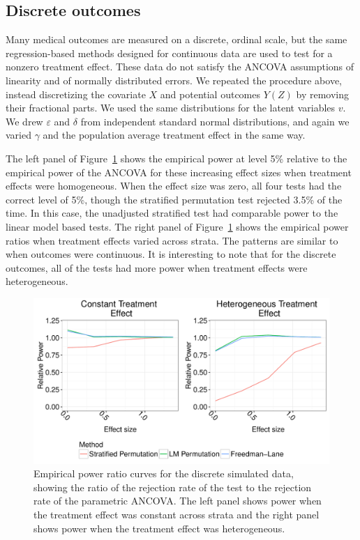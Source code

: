 \documentclass[12pt]{article}
\begin{document}
\subsection{Discrete outcomes}

Many medical outcomes are measured on a discrete, ordinal scale, but the same regression-based methods designed for continuous data are used to test for a nonzero treatment effect.
These data do not satisfy the ANCOVA assumptions of linearity and of normally distributed errors.
We repeated the procedure above, instead discretizing the covariate $X$ and potential outcomes $Y(Z)$ by removing their fractional parts.
We used the same distributions for the latent variables $v$.
We drew $\varepsilon$ and $\delta$ from independent standard normal distributions, and again we varied $\gamma$ and the population average treatment effect in the same way.

The left panel of Figure~\ref{fig:discrete_outcomes_sim_power} shows the empirical power at level 5\% relative to the empirical power of the ANCOVA for these increasing effect sizes when treatment effects were homogeneous.
When the effect size was zero, all four tests had the correct level of 5\%, though the stratified permutation test rejected 3.5\% of the time.
In this case, the unadjusted stratified test had comparable power to the linear model based tests.
The right panel of Figure~\ref{fig:discrete_outcomes_sim_power} shows the empirical power ratios when treatment effects varied across strata.
The patterns are similar to when outcomes were continuous.
It is interesting to note that for the discrete outcomes, all of the tests had more power when treatment effects were heterogeneous.
\begin{figure}[h]
\centering
\includegraphics[width = \textwidth]{fig/discrete_outcomes_simulation_power.pdf}
\caption{Empirical power ratio curves for the discrete simulated data, showing the ratio of the rejection rate of the test to the rejection rate of the parametric ANCOVA. The left panel shows power when the treatment effect was constant across strata and the right panel shows power when the treatment effect was heterogeneous.}
\label{fig:discrete_outcomes_sim_power}
\end{figure}
\end{document}
